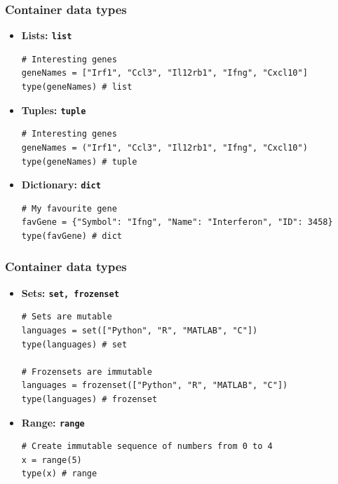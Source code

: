 \documentclass[pdf]{beamer}
\begin{document}
\begin{frame}[fragile]
\frametitle{Container data types}

\begin{itemize}\addtolength{\itemsep}{-0.5\baselineskip}
\item<1-> \textbf{Lists: \texttt{list}}
\begin{lstlisting}[style=python]
# Interesting genes
geneNames = ["Irf1", "Ccl3", "Il12rb1", "Ifng", "Cxcl10"]
type(geneNames) # list
\end{lstlisting}

\item<2-> \textbf{Tuples: \texttt{tuple}}
\begin{lstlisting}[style=python]
# Interesting genes
geneNames = ("Irf1", "Ccl3", "Il12rb1", "Ifng", "Cxcl10")
type(geneNames) # tuple
\end{lstlisting}

\item<3-> \textbf{Dictionary: \texttt{dict}}
\begin{lstlisting}[style=python]
# My favourite gene
favGene = {"Symbol": "Ifng", "Name": "Interferon", "ID": 3458}
type(favGene) # dict
\end{lstlisting}

\end{itemize}
\end{frame}

\begin{frame}[fragile]
\frametitle{Container data types}

\begin{itemize}\addtolength{\itemsep}{0.5\baselineskip}

\item<1-> \textbf{Sets: \texttt{set, frozenset}}
\begin{lstlisting}[style=python]
# Sets are mutable
languages = set(["Python", "R", "MATLAB", "C"])
type(languages) # set

# Frozensets are immutable
languages = frozenset(["Python", "R", "MATLAB", "C"])
type(languages) # frozenset
\end{lstlisting}

\item<2-> \textbf{Range: \texttt{range}}
\begin{lstlisting}[style=python]
# Create immutable sequence of numbers from 0 to 4
x = range(5)
type(x) # range
\end{lstlisting}

\end{itemize}

\end{frame}
\end{document}
